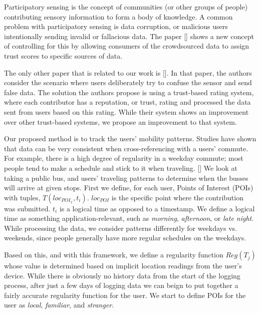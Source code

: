\documentclass[12pt,twocolumn]{article}
\begin{document}
	    Participatory sensing is the concept of communities (or other groups of people) contributing sensory information to form a body of knowledge. %
	    A common problem with participatory sensing is data corruption, or malicious users intentionally sending invalid or fallacious data. The paper %
	    [] shows a new concept of controlling for this by allowing consumers of the crowdsourced data to assign trust scores to specific sources of data. 
	    
	    The only other paper that is related to our work is []. %
	    In that paper, the authors consider the scenario where users deliberately try to confuse the sensor and send false data. The solution the authors propose is using a trust-based rating system, where each contributor has a reputation, or trust, rating and processed the data sent from users based on this rating. While their system shows an improvement over other trust-based systems, we propose an improvement to that system.
	    
	    Our proposed method is to track the users' mobility patterns. Studies have shown that data can be very consistent when cross-referencing with a users' commute. For example, there is a high degree of regularity in a weekday commute; most people tend to make a schedule and stick to it when traveling. [] %
	    We look at taking a public bus, and users' traveling patterns to determine when the busses will arrive at given stops. First we define, for each user, Points of Interest (POIs) with tuples, $T(loc_{POI_x}, t_i)$. $loc_{POI}$ is the specific point where the contribution was submitted. $t_i$ is a logical time as opposed to a timestamp. We define a logical time as something application-relevant, such as \emph{morning}, \emph{afternoon}, or \emph{late night}.
	    While processing the data, we consider patterns differently for weekdays vs. weekends, since people generally have more regular schedules on the weekdays. %
	    
	    Based on this, and with this framework, we define a regularity function $Reg(T_j)$ whose value is determined based on implicit location readings from the user's device. %
	    While there is obviously no history data from the start of the logging process, after just a few days of logging data we can beign to put together a fairly accurate regularity function for the user. We start to define POIs for the user as \emph{local}, \emph{familiar}, and \emph{stranger}. 
	    
\end{document}
